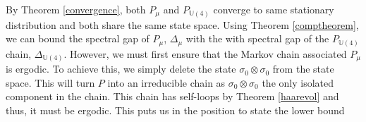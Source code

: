 \documentclass[12pt]{amsart}
\theoremstyle{definition}
\theoremstyle{remark}
\numberwithin{equation}{section}
\theoremstyle{remark}
\begin{document}
By Theorem \ref{convergence}, both $P_{\mu}$ and $P_{\mathbb{U}(4)}$ converge to same stationary distribution and both share the same state space. Using Theorem \ref{comptheorem}, we can bound the spectral gap of $P_\mu$, $\Delta_\mu$ with the with spectral gap of the $P_{\mathbb{U}(4)}$ chain, $\Delta_{\mathbb{U}(4)}$. However, we must first ensure that the Markov chain associated $P_\mu$ is ergodic. To achieve this, we simply delete the state $\sigma_0 \otimes \sigma_0$ from the state space.   This will turn $P$ into an irreducible chain as $\sigma_0 \otimes \sigma_0$ the only isolated component in the chain. This chain has self-loops by Theorem \ref{haarevol} and thus, it must be ergodic. This puts us in the position to state the lower bound

\end{document}
